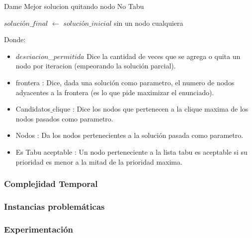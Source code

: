 \begin{algorithm}[H]
    \SetAlgoLined
    \caption{Dame Mejor solucion quitando nodo No Tabu}

	$solución\_final$ $\leftarrow$ $solución\_inicial$ sin un nodo cualquiera \\

\end{algorithm}

Donde:
\begin{itemize}
 \item $desviacion$\_$permitida$ Dice la cantidad de veces que se agrega o quita un nodo por iteracion (empeorando la solución parcial).
 \item frontera : Dice, dada una solución como parametro, el numero de nodos adyacentes a la frontera (es lo que pide maximizar el enunciado).
 \item Candidatos$\_$clique : Dice los nodos que pertenecen a la clique maxima de los nodos pasados como parametro.
 \item Nodos : Da los nodos pertenecientes a la solución pasada como parametro.
 \item Es Tabu aceptable : Un nodo perteneciente a la lista tabu es aceptable si su prioridad es menor a la mitad de la prioridad maxima.
\end{itemize}

\subsubsection{Complejidad Temporal}
\subsubsection{Instancias problemáticas}
\subsubsection{Experimentación}
